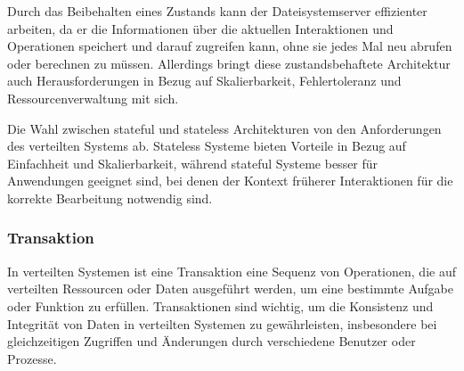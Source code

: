 Durch das Beibehalten eines Zustands kann der Dateisystemserver effizienter arbeiten, da er die Informationen über die aktuellen Interaktionen und Operationen speichert und darauf zugreifen kann, ohne sie jedes Mal neu abrufen oder berechnen zu müssen. Allerdings bringt diese zustandsbehaftete Architektur auch Herausforderungen in Bezug auf Skalierbarkeit, Fehlertoleranz und Ressourcenverwaltung mit sich.

Die Wahl zwischen stateful und stateless Architekturen von den Anforderungen des verteilten Systems ab. Stateless Systeme bieten Vorteile in Bezug auf Einfachheit und Skalierbarkeit, während stateful Systeme besser für Anwendungen geeignet sind, bei denen der Kontext früherer Interaktionen für die korrekte Bearbeitung notwendig sind. 

\subsubsection{Transaktion}
In verteilten Systemen ist eine Transaktion eine Sequenz von Operationen, die auf verteilten Ressourcen oder Daten ausgeführt werden, um eine bestimmte Aufgabe oder Funktion zu erfüllen. Transaktionen sind wichtig, um die Konsistenz und Integrität von Daten in verteilten Systemen zu gewährleisten, insbesondere bei gleichzeitigen Zugriffen und Änderungen durch verschiedene Benutzer oder Prozesse.

